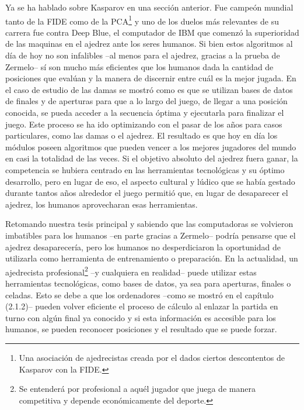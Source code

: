 \documentclass[twoside,openright,12pt,a4paper,spanish]{book}
\begin{document}
Ya se ha hablado sobre Kasparov en una sección anterior. Fue campeón mundial tanto de la FIDE como de la PCA\footnote{Una asociación de ajedrecistas creada por el dados ciertos descontentos de Kasparov con la FIDE.} y uno de los duelos más relevantes de su carrera fue contra Deep Blue, el computador de IBM que comenzó la superioridad de las maquinas en el ajedrez ante los seres humanos. Si bien estos algoritmos al día de hoy no son infalibles --al menos para el ajedrez, gracias a la prueba de Zermelo-- sí son mucho más eficientes que los humanos dada la cantidad de posiciones que evalúan y la manera de discernir entre cuál es la mejor jugada. En el caso de estudio de las damas se mostró como es que se utilizan bases de datos de finales y de aperturas para que a lo largo del juego, de llegar a una posición conocida, se pueda acceder a la secuencia óptima y ejecutarla para finalizar el juego. Este proceso se ha ido optimizando con el pasar de los años para casos particulares, como las damas o el ajedrez. El resultado es que hoy en día los módulos poseen algoritmos que pueden vencer a los mejores jugadores del mundo en casi la totalidad de las veces. Si el objetivo absoluto del ajedrez fuera ganar, la competencia se hubiera centrado en las herramientas tecnológicas y su óptimo desarrollo, pero en lugar de eso, el aspecto cultural y lúdico que se había gestado durante tantos años alrededor el juego permitió que, en lugar de desaparecer el ajedrez, los humanos aprovecharan esas herramientas.

Retomando nuestra tesis principal y sabiendo que las computadoras se volvieron imbatibles para los humanos --en parte gracias a Zermelo-- podr\'ia pensarse que el ajedrez desaparecer\'ia, pero los humanos no desperdiciaron la oportunidad de utilizarla como herramienta de entrenamiento o preparación. En la actualidad, un ajedrecista profesional\footnote{Se entenderá por profesional a aquél jugador que juega de manera competitiva y depende económicamente del deporte.} --y cualquiera en realidad-- puede utilizar estas herramientas tecnológicas, como bases de datos, ya sea para aperturas, finales o celadas. Esto se debe a que los ordenadores --como se mostró en el capítulo (2.1.2)-- pueden volver eficiente el proceso de cálculo al enlazar la partida en turno con algún final ya conocido y si esta información es accesible para los humanos, se pueden reconocer posiciones y el resultado que se puede forzar.
\end{document}
